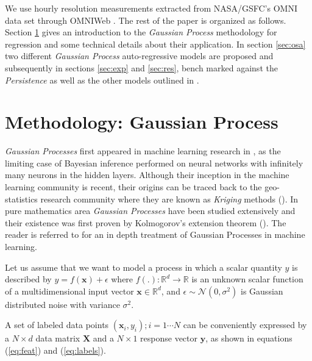 \documentclass[referee,a4paper,12pt,traditabstract]{swsc}
\begin{document}
\begin{linenumbers}
We use hourly resolution measurements extracted from NASA/GSFC's OMNI data set through OMNIWeb \citep{OmniPaper}. The rest of the paper is organized as follows. Section \ref{sec:method} gives an introduction to the \emph{Gaussian Process} methodology for regression and some technical details about their application. In section \ref{sec:osa} two different \emph{Gaussian Process} auto-regressive models are proposed and subsequently in sections \ref{sec:exp} and \ref{sec:res}, bench marked against the \emph{Persistence} as well as the other models outlined in \citet{Ji2012}.

  
\section{Methodology: Gaussian Process} \label{sec:method}

\emph{Gaussian Processes} first appeared in machine learning research in \citet{Neal:1996:BLN:525544}, as the limiting case of Bayesian inference performed on neural networks with infinitely many neurons in the hidden layers. Although their inception in the machine learning community is recent, their origins can be traced back to the geo-statistics research community where they are known as \emph{Kriging} methods (\citet{krige1951statistical}). In pure mathematics area \emph{Gaussian Processes} have been studied extensively and their existence was first proven by Kolmogorov's extension theorem (\citet{tao2011introduction}). The reader is referred to \cite{Rasmussen:2005:GPM:1162254} for an in depth treatment of Gaussian Processes in machine learning.

Let us assume that we want to model a process in which a scalar quantity $y$ is described by $y = f(\mathbf{x}) + \epsilon$ where   $f(.): \mathbb{R}^d \rightarrow \mathbb{R}$ is an unknown scalar function of a multidimensional input vector $\mathbf{x} \in \mathbb{R}^d$, and $\epsilon \sim \mathcal{N}(0, \sigma^2)$ is Gaussian distributed noise with variance $\sigma^2$.

A set of labeled data points ${(\mathbf{x}_i, y_i); i = 1 \cdots N}$ can be conveniently expressed by a $N \times d$ data matrix $\mathbf{X}$ and a $N \times 1$ response vector $\mathbf{y}$, as shown in equations (\ref{eq:feat}) and (\ref{eq:labels}).


\end{linenumbers}
\end{document}
